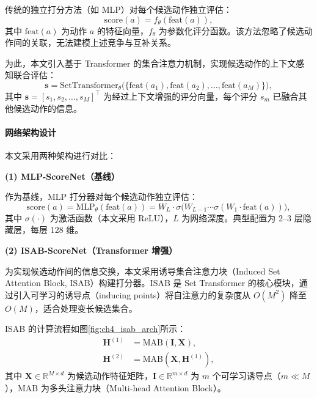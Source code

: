 \documentclass[type=master]{fduthesis}
\begin{document}
传统的独立打分方法（如 MLP）对每个候选动作独立评估：
\begin{equation}
\text{score}(a) = f_\theta(\text{feat}(a)),
\label{eq:ch4_mlp_scoring}
\end{equation}
其中 $\text{feat}(a)$ 为动作 $a$ 的特征向量，$f_\theta$ 为参数化评分函数。该方法忽略了候选动作间的关联，无法建模上述竞争与互补关系。

为此，本文引入基于 Transformer 的集合注意力机制，实现候选动作的上下文感知联合评估：
\begin{equation}
\mathbf{s} = \text{SetTransformer}_\theta\big(\{\text{feat}(a_1), \text{feat}(a_2), \ldots, \text{feat}(a_M)\}\big),
\label{eq:ch4_set_transformer}
\end{equation}
其中 $\mathbf{s} = [s_1, s_2, \ldots, s_M]^\top$ 为经过上下文增强的评分向量，每个评分 $s_m$ 已融合其他候选动作的信息。

\paragraph{网络架构设计}
本文采用两种架构进行对比：

\textbf{(1) MLP-ScoreNet（基线）}

作为基线，MLP 打分器对每个候选动作独立评估：
\begin{equation}
\text{score}(a) = \text{MLP}_\theta(\text{feat}(a)) = W_L \cdot \sigma\big(W_{L-1} \cdots \sigma(W_1 \cdot \text{feat}(a))\big),
\label{eq:ch4_mlp_arch}
\end{equation}
其中 $\sigma(\cdot)$ 为激活函数（本文采用 ReLU），$L$ 为网络深度。典型配置为 2--3 层隐藏层，每层 128 维。

\textbf{(2) ISAB-ScoreNet（Transformer 增强）}

为实现候选动作间的信息交换，本文采用诱导集合注意力块（Induced Set Attention Block, ISAB）\cite{lee2019set}构建打分器。ISAB 是 Set Transformer 的核心模块，通过引入可学习的诱导点（inducing points）将自注意力的复杂度从 $O(M^2)$ 降至 $O(M)$，适合处理变长候选集合。

ISAB 的计算流程如图\ref{fig:ch4_isab_arch}所示：
\begin{align}
\mathbf{H}^{(1)} &= \text{MAB}(\mathbf{I}, \mathbf{X}), \label{eq:ch4_isab_1} \\
\mathbf{H}^{(2)} &= \text{MAB}(\mathbf{X}, \mathbf{H}^{(1)}), \label{eq:ch4_isab_2}
\end{align}
其中 $\mathbf{X} \in \mathbb{R}^{M \times d}$ 为候选动作特征矩阵，$\mathbf{I} \in \mathbb{R}^{m \times d}$ 为 $m$ 个可学习诱导点（$m \ll M$），$\text{MAB}$ 为多头注意力块（Multi-head Attention Block）。
\end{document}
